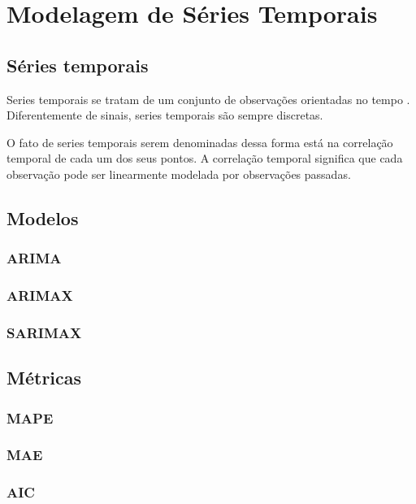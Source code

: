 \chapter{Modelagem de Séries Temporais}
\label{cap:series_temp}

\section{Séries temporais}


Series temporais se tratam de um conjunto de observações orientadas no tempo \cite{brockwell2002introduction}. Diferentemente de sinais, series temporais são sempre discretas.

O fato de series temporais serem denominadas dessa forma está na correlação temporal de cada um dos seus pontos. A correlação temporal significa que cada observação pode ser linearmente modelada por observações passadas. 

\section{Modelos}

\subsection{ARIMA}

\subsection{ARIMAX}

\subsection{SARIMAX}

\section{Métricas}

\subsection{MAPE}

\subsection{MAE}

\subsection{AIC}

%
%
